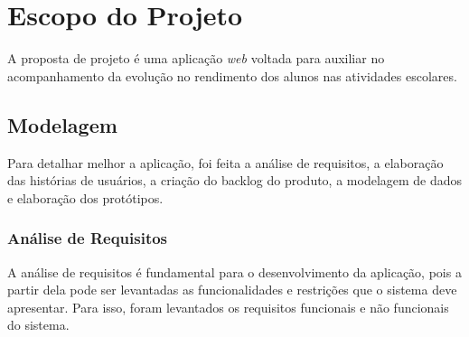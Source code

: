 \section{Escopo do Projeto}
A proposta de projeto é uma aplicação \textit{web} voltada para auxiliar no acompanhamento da evolução no rendimento dos alunos nas atividades escolares. 

\subsection{Modelagem}
Para detalhar melhor a aplicação, foi feita a análise de requisitos, a elaboração das histórias de usuários, a criação do backlog do produto, a modelagem de dados e elaboração dos protótipos.

\subsubsection{Análise de Requisitos}
A análise de requisitos é fundamental para o desenvolvimento da aplicação, pois a partir dela pode ser levantadas as funcionalidades e restrições que o sistema deve apresentar. Para isso, foram levantados os requisitos funcionais e não funcionais do sistema.

